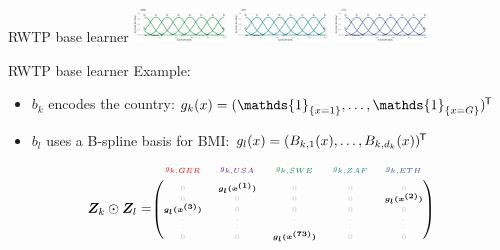 \documentclass[t,10pt]{beamer}
\begin{document}
\begin{frame}{RWTP base learner}
  {\includegraphics[width=0.19\textwidth]{figures/fig-bs0-SWE.png}}
  {\includegraphics[width=0.19\textwidth]{figures/fig-bs0-ZAF.png}}
  {\includegraphics[width=0.19\textwidth]{figures/fig-bs0-ETH.png}}
  \addtocounter{framenumber}{-1}
\end{frame}

\begin{frame}{RWTP base learner}
  Example:
  \begin{itemize}
    \item $b_k$ encodes the country: $g_k(x) = (\mathds{1}_{\{x = 1\}}, \dots, \mathds{1}_{\{x = G\}})^\tran$
    \item $b_l$ uses a B-spline basis for BMI: $g_l(x) = (B_{k,1}(x), \dots, B_{k,d_k}(x))^\tran$
  \end{itemize}
  $$
    \design_k \odot \design_l = \tiny\begin{blockarray}{ccccc}
      \color[HTML]{EE0000}g_{k,GER} & \color[HTML]{631879}g_{k,USA} & \color[HTML]{008B45}g_{k,SWE} & \color[HTML]{008280}g_{k,ZAF} & \color[HTML]{3B4992}g_{k,ETH}\\
    \begin{block}{(ccccc)}
      \phantom{x}\\
      \color{lightgray}0 & \color{black}\bm{g_l(x^{(1)})} & \color{lightgray}0 & \color{lightgray}0 & \color{lightgray}0 \\
      \color{lightgray}0 & \color{lightgray}0 & \color{lightgray}0 & \color{lightgray}0 & \color{black}\bm{g_l(x^{(2)})} \\
      \color{black}\bm{g_l(x^{(3)})} & \color{lightgray}0 & \color{lightgray}0 & \color{lightgray}0 & \color{lightgray}0 \\
      \color{lightgray}\vdots & \color{lightgray}\vdots & \color{lightgray}\vdots & \color{lightgray}\vdots & \color{lightgray}\vdots \\
      \color{lightgray}0 & \color{lightgray}0 & \color{black}\bm{g_l(x^{(73)})} & \color{lightgray}0 & \color{lightgray}0 \\

\end{block}
\end{blockarray}$$
\end{frame}
\end{document}
